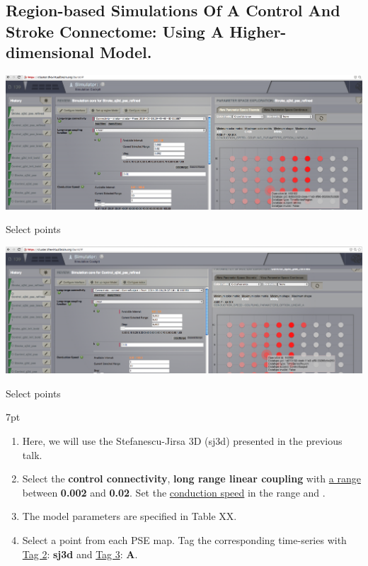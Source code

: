 \documentclass{tufte-handout}
\newenvironment{simulation}{%
  \def\FrameCommand{%
    \hspace{1pt}%
    {\color{ForestGreen}\vrule width 2pt}%
    {\color{simulationshade}\vrule width 4pt}%
    \colorbox{simulationshade}%
  }%
  \MakeFramed{\advance\hsize-\width\FrameRestore}%
  \noindent\hspace{-4.55pt}%
  \begin{adjustwidth}{}{7pt}%
  \vspace{2pt}\vspace{2pt}%
}
{%
  \vspace{2pt}\end{adjustwidth}\endMakeFramed%
}
\begin{document}
\subsection{Region-based Simulations Of A Control And Stroke Connectome: Using A Higher-dimensional Model.}

\begin{marginfigure}%
  \includegraphics[width=0.82\linewidth]{Handout_UI_ModellingStructuralLesions_SelectPointFromPSE_a}
    \caption{Select points}
  \label{fig:steps_sim}
  \end{marginfigure}
  \begin{marginfigure}
\includegraphics[width=0.82\linewidth]{Handout_UI_ModellingStructuralLesions_SelectPointFromPSE_b}
  \caption{Select points}
  \label{fig:steps_sim_03}
\end{marginfigure}

  \begin{simulation}
\begin{enumerate}
  \item Here, we will use the Stefanescu-Jirsa 3D (sj3d) presented in the previous talk. 
  \item Select the \textbf{control connectivity}, \textbf{long range linear coupling} with \underline{a range} between \textbf{0.002} and \textbf{0.02}. Set the \underline{conduction speed} in the range \textbf{} and \textbf{}.
  \item The model parameters are specified in Table XX. 
  \item Select a point from each PSE map. Tag the corresponding time-series with \underline{Tag 2}: \textbf{sj3d} and \underline{Tag 3}: \textbf{A}. 
   \end{enumerate}
\end{simulation}
\end{document}
